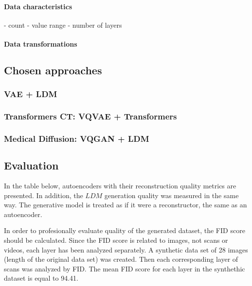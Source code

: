 \paragraph{Data characteristics}
- count
- value range
- number of layers
\paragraph{Data transformations}

\newpage
\subsection{Chosen approaches}
\subsubsection{VAE + LDM}


\newpage
\subsubsection{Transformers CT: VQVAE + Transformers}

\newpage
\subsubsection{Medical Diffusion: VQGAN + LDM}


\subsection{Evaluation}

In the table below, autoencoders with their reconstruction quality metrics are presented. 
In addition, the $LDM$ generation quality was measured in the same way. The generative model is treated as if it were a reconstructor, the same as an autoencoder.

In order to profesionally evaluate quality of the generated dataset, the FID score should be calculated. Since the FID score is related to images, not scans or videos, each layer has been analyzed separately. 
A synthetic data set of 28 images (length of the original data set) was created. Then each corresponding layer of scans was analyzed by FID. The mean FID score for each layer in the synthethic dataset is equal to 94.41. 

